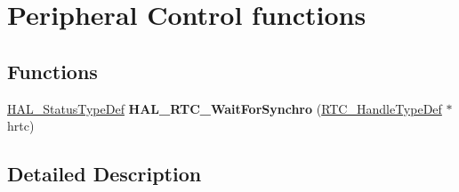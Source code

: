\hypertarget{group___r_t_c___exported___functions___group4}{}\section{Peripheral Control functions}
\label{group___r_t_c___exported___functions___group4}
\subsection*{Functions}
\begin{DoxyCompactItemize}
\item 
\mbox{\label{group___r_t_c___exported___functions___group4_ga62efc08017f7dc4db0bc72f7c68085ad}} 
\hyperlink{stm32f0xx__hal__def_8h_a63c0679d1cb8b8c684fbb0632743478f}{H\+A\+L\+\_\+\+Status\+Type\+Def} {\bfseries H\+A\+L\+\_\+\+R\+T\+C\+\_\+\+Wait\+For\+Synchro} (\hyperlink{struct_r_t_c___handle_type_def}{R\+T\+C\+\_\+\+Handle\+Type\+Def} $\ast$hrtc)
\end{DoxyCompactItemize}


\subsection{Detailed Description}
